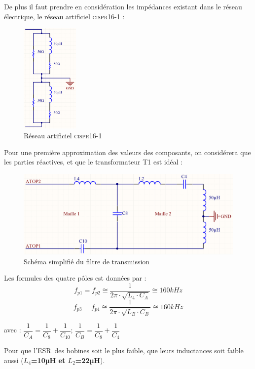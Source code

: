 \documentclass[11pt, a4paper, twoside]{book}
\begin{document}
{De plus il faut prendre en considération les impédances existant dans le réseau électrique, le réseau artificiel \textsc{cispr16-1} :
\begin{figure}[H]
\centering
\includegraphics[width=0.25\textwidth]{cispr}
\caption{Réseau artificiel \textsc{cispr16-1}}
\end{figure}
Pour une première approximation des valeurs des composants, on considérera que les parties réactives, et que le transformateur T1 est idéal :
\begin{figure}[H]
\centering
\includegraphics[width=\textwidth]{simplifiedTransmission}
\caption{Schéma simplifié du filtre de transmission}
\end{figure}
Les formules des quatre pôles est données par :
\begin{equation}
\label{equ:pole12}
f_{p1}=f_{p2}\cong \dfrac{1}{2\pi \cdot \sqrt{L_4\cdot C_A}}\cong 160kHz
\end{equation}
\begin{equation}
\label{equ:pole34}
f_{p3}=f_{p4}\cong \dfrac{1}{2\pi \cdot \sqrt{L_B\cdot C_B}}\cong 160kHz
\end{equation}
\begin{center}
avec : $\dfrac{1}{C_A}=\dfrac{1}{C_8}+\dfrac{1}{C_{10}}$;
$\dfrac{1}{C_B}=\dfrac{1}{C_8}+\dfrac{1}{C_4}$
\end{center}
Pour que l'ESR\footnotemark \ des bobines soit le plus faible, que leurs inductances soit faible aussi (\textbf{$L_4$=10µH et $L_2$=22µH}).
\\

}
\end{document}
